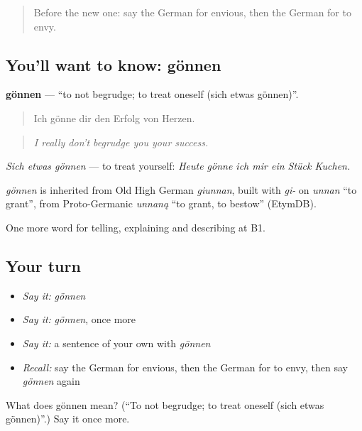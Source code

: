 \label{lesson:GE-C466-goennen}



\begin{quote}
Before the new one: say the German for envious, then the German for to envy.
\end{quote}

\subsection*{You'll want to know: gönnen}
\textbf{gönnen} — \textquotedblleft{}to not begrudge; to treat oneself (sich etwas gönnen)\textquotedblright{}.

\begin{quote}
Ich gönne dir den Erfolg von Herzen.
\end{quote}

\begin{quote}
\emph{I really don't begrudge you your success.}
\end{quote}

\emph{Sich etwas gönnen} — to treat yourself: \emph{Heute gönne ich mir ein Stück Kuchen.}

\begin{cousinweb}
\emph{gönnen} is inherited from Old High German \emph{giunnan}, built with \emph{gi-} on \emph{unnan} \textquotedblleft{}to grant\textquotedblright{}, from Proto-Germanic \emph{unnaną} \textquotedblleft{}to grant, to bestow\textquotedblright{} (EtymDB).
\end{cousinweb}

\begin{grammarlens}[title={What you've built}]
One more word for telling, explaining and describing at B1.
\end{grammarlens}

\subsection*{Your turn}
\begin{itemize}
\raggedright
  \item \emph{Say it:} \emph{gönnen}
  \item \emph{Say it:} \emph{gönnen}, once more
  \item \emph{Say it:} a sentence of your own with \emph{gönnen}
  \item \emph{Recall:} say the German for envious, then the German for to envy, then say \emph{gönnen} again
\end{itemize}

\begin{tcolorbox}[breakable,colback=teal!4,colframe=teal!35!black,title={Before you move on}]
What does gönnen mean? (\textquotedblleft{}To not begrudge; to treat oneself (sich etwas gönnen)\textquotedblright{}.) Say it once more.
\end{tcolorbox}
